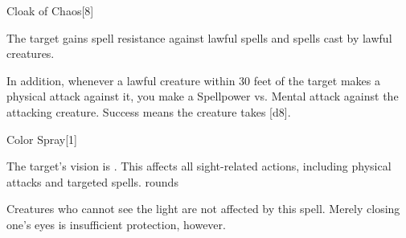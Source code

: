 \begin{spellsection}{Cloak of Chaos}[8]
    \begin{spellheader}
    \end{spellheader}
    \begin{spellcontent}
        \begin{spelltargetinginfo}
        \end{spelltargetinginfo}
        \begin{spelleffects}
            \spelleffect The target gains spell resistance against lawful spells and spells cast by lawful creatures.

            In addition, whenever a lawful creature within 30 feet of the target makes a physical attack against it, you make a Spellpower vs. Mental attack against the attacking creature. Success means the creature takes [d8].
            \spelldur \durshort \dismissable
        \end{spelleffects}
    \end{spellcontent}
    \begin{spellfooter}
        \miscastexplode
    \end{spellfooter}
\end{spellsection}

\begin{spellsection}{Color Spray}[1]
    \begin{spellheader}
    \end{spellheader}
    \begin{spellcontent}
        \begin{spelltargetinginfo}
        \end{spelltargetinginfo}
        \begin{spelleffects}
            \spelleffect The target's vision is \impaired. This affects all sight-related actions, including physical attacks and targeted spells.
             rounds
        \end{spelleffects}
    \end{spellcontent}
    \begin{spellfooter}
        \spellnotes Creatures who cannot see the light are not affected by this spell. Merely closing one's eyes is insufficient protection, however.
        \miscastexplode
    \end{spellfooter}
\end{spellsection}

